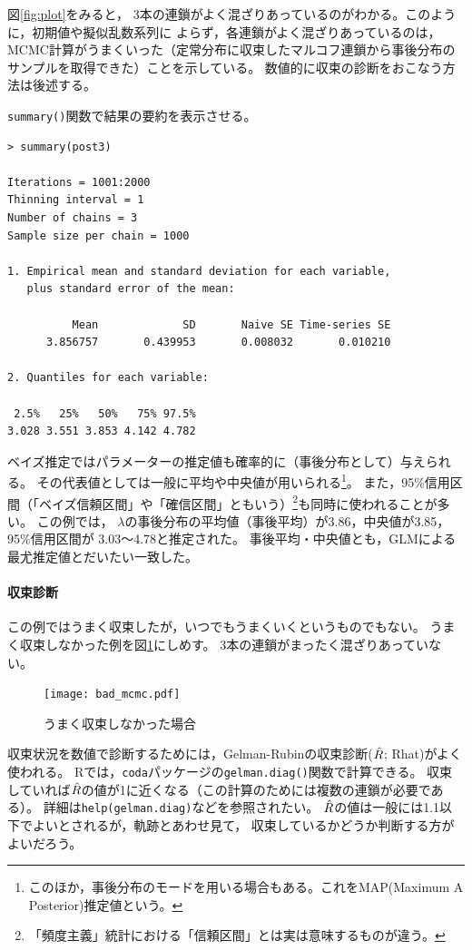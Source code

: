 \documentclass[11pt,uplatex]{jsarticle}
\begin{document}
図\ref{fig:plot}をみると，
3本の連鎖がよく混ざりあっているのがわかる。このように，初期値や擬似乱数系列に
よらず，各連鎖がよく混ざりあっているのは，MCMC計算がうまくいった（定常分布に収束したマルコフ連鎖から事後分布のサンプルを取得できた）ことを示している。
数値的に収束の診断をおこなう方法は後述する。


\texttt{summary()}関数で結果の要約を表示させる。
\begin{lstlisting}
> summary(post3)

Iterations = 1001:2000
Thinning interval = 1 
Number of chains = 3 
Sample size per chain = 1000 

1. Empirical mean and standard deviation for each variable,
   plus standard error of the mean:

          Mean             SD       Naive SE Time-series SE 
      3.856757       0.439953       0.008032       0.010210 

2. Quantiles for each variable:

 2.5%   25%   50%   75% 97.5% 
3.028 3.551 3.853 4.142 4.782 

\end{lstlisting}
%
ベイズ推定ではパラメーターの推定値も確率的に（事後分布として）与えられる。
その代表値としては一般に平均や中央値が用いられる\footnote{このほか，事後分布のモードを用いる場合もある。これをMAP(Maximum A Posterior)推定値という。}。
また，95\%信用区間（「ベイズ信頼区間」や「確信区間」ともいう）\footnote{「頻度主義」統計における「信頼区間」とは実は意味するものが違う。}も同時に使われることが多い。
この例では，
$\lambda$の事後分布の平均値（事後平均）が3.86，中央値が3.85，95\%信用区間が
3.03〜4.78と推定された。
事後平均・中央値とも，GLMによる最尤推定値とだいたい一致した。

\paragraph{収束診断}
この例ではうまく収束したが，いつでもうまくいくというものでもない。
うまく収束しなかった例を図\ref{bad_mcmc}にしめす。
3本の連鎖がまったく混ざりあっていない。
%
\begin{figure}[htbp]
	\begin{center}
		\texttt{[image: bad\_mcmc.pdf]}
	\end{center}
	\caption{うまく収束しなかった場合}
	\label{bad_mcmc}
\end{figure}

収束状況を数値で診断するためには，Gelman-Rubinの収束診断($\Hat{R}$; Rhat)がよく使われる。
\textsf{R}では，\texttt{coda}パッケージの\texttt{gelman.diag()}関数で計算できる。
収束していれば$\Hat{R}$の値が1に近くなる（この計算のためには複数の連鎖が必要である）。
詳細は\texttt{help(gelman.diag)}などを参照されたい。
$\Hat{R}$の値は一般には1.1以下でよいとされるが，軌跡とあわせ見て，
収束しているかどうか判断する方がよいだろう。
\end{document}
